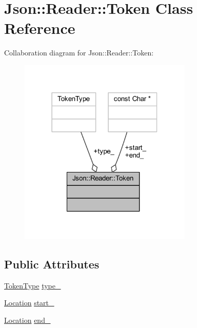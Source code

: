 \hypertarget{class_json_1_1_reader_1_1_token}{}\section{Json\+:\+:Reader\+:\+:Token Class Reference}
\label{class_json_1_1_reader_1_1_token}


Collaboration diagram for Json\+:\+:Reader\+:\+:Token\+:\nopagebreak
\begin{figure}[H]
\begin{center}
\leavevmode
\includegraphics[width=234pt]{class_json_1_1_reader_1_1_token__coll__graph}
\end{center}
\end{figure}
\subsection*{Public Attributes}
\begin{DoxyCompactItemize}
\item 
\hyperlink{class_json_1_1_reader_aa35e6ab574dc399a0a645ad98ed66bc9}{Token\+Type} \hyperlink{class_json_1_1_reader_1_1_token_aa0f06d0105ec3d8cb42427c66b991bad}{type\+\_\+}
\item 
\hyperlink{class_json_1_1_reader_a46795b5b272bf79a7730e406cb96375a}{Location} \hyperlink{class_json_1_1_reader_1_1_token_aff87d677b9ac4b52542a00b0d6673249}{start\+\_\+}
\item 
\hyperlink{class_json_1_1_reader_a46795b5b272bf79a7730e406cb96375a}{Location} \hyperlink{class_json_1_1_reader_1_1_token_a7d3bc0fa40097f435d184be4b1fd5ae1}{end\+\_\+}
\end{DoxyCompactItemize}


